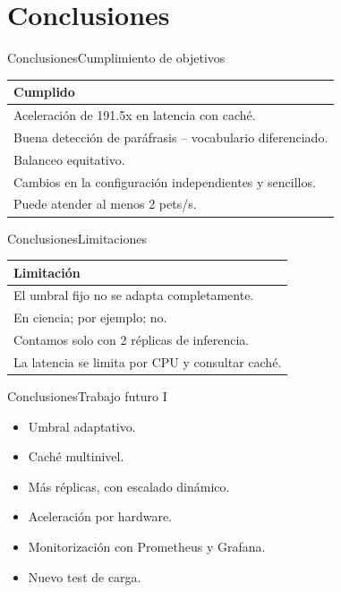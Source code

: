 \section{Conclusiones}
\begin{frame}{Conclusiones}{Cumplimiento de objetivos}
\begin{table}[H]
    \centering

    \begin{tabular}{p{10cm}}
        \toprule
        \textbf{Cumplido}  \\
        \midrule
        Aceleración de 191.5x en latencia con caché. \\
        Buena detección de paráfrasis -- vocabulario diferenciado.   \\ 
        Balanceo equitativo. \\
        Cambios en la configuración independientes y sencillos. \\ 
        Puede atender al menos 2 pets/s. \\ 
        \bottomrule
    \end{tabular}

\end{table}
\end{frame}

\begin{frame}{Conclusiones}{Limitaciones}
\begin{table}[H]
    \centering

    \begin{tabular}{p{10cm}}
        \toprule
        \textbf{Limitación}  \\
        \midrule
        El umbral fijo no se adapta completamente.\\ 
        En ciencia; por ejemplo; no.    \\
        Contamos solo con 2 réplicas de inferencia.   \\ 
        La latencia se limita por CPU y consultar caché. \\
        \bottomrule
    \end{tabular}

\end{table}
\end{frame}

\begin{frame}{Conclusiones}{Trabajo futuro I}
\begin{itemize}
    \item Umbral adaptativo.
    \item Caché multinivel.
    \item Más réplicas, con escalado dinámico.
    \item Aceleración por hardware.
    \item Monitorización con Prometheus y Grafana.
    \item Nuevo test de carga.
\end{itemize}
\end{frame}


